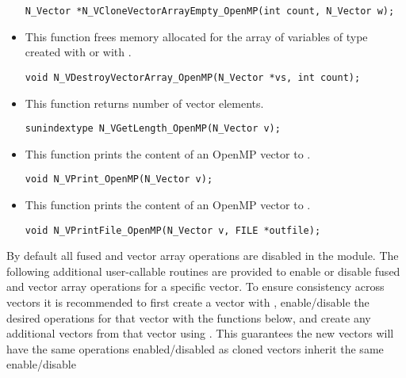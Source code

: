 \begin{itemize}
 

 \verb|N_Vector *N_VCloneVectorArrayEmpty_OpenMP(int count, N_Vector w);|


\item {}

 This function frees memory allocated for the array of  variables of type
  created with  or with
 .

 

 \verb|void N_VDestroyVectorArray_OpenMP(N_Vector *vs, int count);|


\item {}

 This function returns number of vector elements.

 
 
 \verb|sunindextype N_VGetLength_OpenMP(N_Vector v);|


\item {}

 This function prints the content of an OpenMP vector to .
 
 \verb|void N_VPrint_OpenMP(N_Vector v);|


\item {}

 This function prints the content of an OpenMP vector to .
 
 \verb|void N_VPrintFile_OpenMP(N_Vector v, FILE *outfile);|

\end{itemize}
By default all fused and vector array operations are disabled in the {\nvecopenmp}
module. The following additional user-callable routines are provided to
enable or disable fused and vector array operations for a specific vector. To
ensure consistency across vectors it is recommended to first create a vector
with , enable/disable the desired operations for that vector
with the functions below, and create any additional vectors from that vector
using . This guarantees the new vectors will have the same
operations enabled/disabled as cloned vectors inherit the same enable/disable
